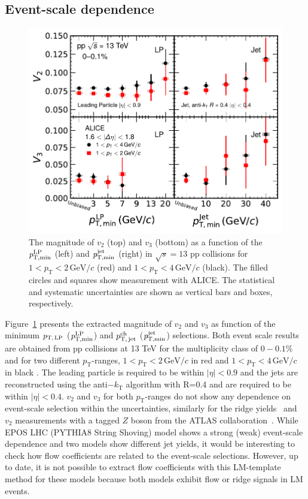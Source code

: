 \subsection{Event-scale dependence}
\begin{figure}[h!]
	\centering
	\includegraphics[width=0.6 \textwidth]{figures/Fig4_vn_LP.pdf}
	\caption{The magnitude of $v_2$ (top) and $v_3$ (bottom) as a function of the $\it{p}^{\rm{LP}}_{\rm{T,min}}$ (left) and $\it{p}^{\rm{jet}}_{\rm{T,min}}$ (right) in $\sqrt{s}=13$ pp collisions for $1<p_{\mathrm{T}}<2\,\mathrm{GeV}/c$ (red) and $1<p_{\mathrm{T}}<4\,\mathrm{GeV}/c$ (black). The filled circles and squares show measurement with ALICE. The statistical and systematic uncertainties are shown as vertical bars and boxes, respectively.}
	\label{fig:LPjet23}
\end{figure}    

Figure~\ref{fig:LPjet23} presents the extracted magnitude of $v_2$ and $v_3$ as function of the minimum $p_\mathrm{T,\,LP}$ ($\it{p}^{\rm{LP}}_{\rm{T,min}}$) and $p_\mathrm{T,\,jet}^\mathrm{ch}$ ($\it{p}^{\rm{jet}}_{\rm{T,min}}$) selections. Both event scale results are obtained from pp collisions at 13 TeV for the multiplicity class of $0-0.1\%$ and for two different $p_\mathrm{T}$-ranges, $1<p_{\mathrm{T}}<2\,\mathrm{GeV}/c$ in red and $1<p_{\mathrm{T}}<4\,\mathrm{GeV}/c$ in black . The leading particle is required to be within $|\eta|<0.9$ and the jets are reconstructed using the anti$-k_\mathrm{T}$ algorithm with R=0.4 and are required to be within $|\eta|<0.4$. $v_2$ and $v_3$ for both $p_\mathrm{T}$-ranges do not show any dependence on event-scale selection within the uncertainties, similarly for the ridge yields~\cite{ALICE:2021nir} and $v_{2}$ measurements  with a tagged $Z$ boson from the ATLAS collaboration~\cite{Aaboud:2019mcw}.
While  EPOS LHC (PYTHIA8 String Shoving) model shows a strong (weak)  event-scale dependence and two models show different jet yields, it would be interesting to check how flow coefficients are related to the event-scale selections. However, up to date, it is not possible to extract flow coefficients with this LM-template method for these models because both models exhibit flow or ridge signals in LM events.

